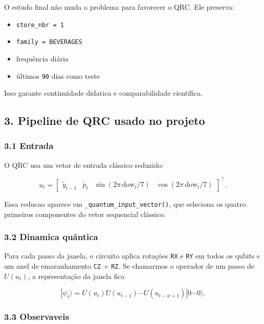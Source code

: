 \documentclass[12pt]{article}
\providecommand{\tightlist}{%
          \setlength{\itemsep}{0pt}\setlength{\parskip}{0pt}}
\begin{document}
O estudo final não muda o problema para favorecer o QRC. Ele preserva:

\begin{itemize}
\tightlist
\item
  \texttt{store\_nbr\ =\ 1}
\item
  \texttt{family\ =\ BEVERAGES}
\item
  frequência diária
\item
  últimos \texttt{90} dias como teste
\end{itemize}

Isso garante continuidade didatica e comparabilidade científica.

\subsection{3. Pipeline de QRC usado no projeto}\label{3-pipeline-de-qrc-usado-no-projeto}

\subsubsection{3.1 Entrada}\label{31-entrada}

O QRC usa um vetor de entrada clássico reduzido:

\[
u_t =
\begin{bmatrix}
\widetilde{y}_{t-1} &
\widetilde{p}_t &
\sin(2\pi \, \mathrm{dow}_t / 7) &
\cos(2\pi \, \mathrm{dow}_t / 7)
\end{bmatrix}^\top.
\]

Essa reducao aparece em \texttt{\_quantum\_input\_vector()}, que seleciona os quatro primeiros componentes do vetor sequencial clássico.

\subsubsection{3.2 Dinamica quântica}\label{32-dinamica-quuxe2ntica}

Para cada passo da janela, o circuito aplica rotações \texttt{RX} e \texttt{RY} em todos os qubits e um anel de emaranhamento \texttt{CZ} + \texttt{RZ}. Se chamarmos o operador de um passo de \(U(u_t)\), a representação da janela fica

\[
|\psi_t\rangle = U(u_t) U(u_{t-1}) \cdots U(u_{t-w+1}) |0 \cdots 0\rangle.
\]

\subsubsection{3.3 Observaveis}\label{33-observaveis}
\end{document}
